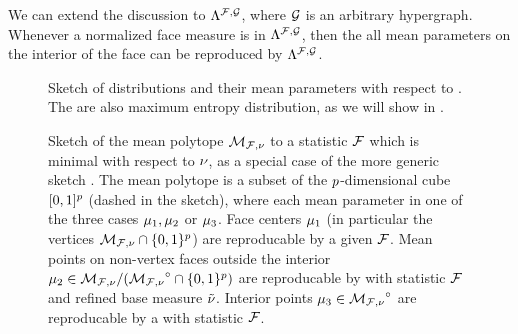 We can extend the discussion to $\Lambda^{\mathcal{F},\mathcal{G}}$, where $\mathcal{G}$ is an arbitrary hypergraph.
Whenever a normalized face measure is in $\Lambda^{\mathcal{F},\mathcal{G}}$, then the all mean parameters on the interior of the face can be reproduced by $\Lambda^{\mathcal{F},\mathcal{G}}$.

%




\begin{figure}[t]
    \begin{center}
        
    \end{center}
    \caption{Sketch of distributions and their mean parameters with respect to .
    The \HybridLogicNetworks{} are also maximum entropy distribution, as we will show in .}
    \label{fig:reproducableSketch}
\end{figure}

\begin{figure}[t]
    \begin{center}
        
    \end{center}
    \caption{Sketch of the mean polytope ${\mathcal{M}_{\mathcal{F},\nu}}$ to a statistic $\mathcal{F}$ which is minimal with respect to $\nu$, as a special case of the more generic sketch .
    The mean polytope is a subset of the $p$-dimensional cube $[0,1]^{p}$ (dashed in the sketch), where each mean parameter in one of the three cases $\mu_{1},\mu_{2}$ or $\mu_{3}$.
    \textcolor{\concolor}{Face centers} $\mu_{1}$ (in particular the vertices $\mathcal{M}_{\mathcal{F},\nu}\cap\{0,1\}^{p}$) are reproducable by a \HardLogicNetwork{} given $\mathcal{F}$.
    Mean points on non-vertex faces outside the interior $\mu_{2}\in\mathcal{M}_{\mathcal{F},\nu}/({\mathcal{M}_{\mathcal{F},\nu}}^{\circ}\cap\{0,1\}^{p})$ are reproducable by \HybridLogicNetworks{} with statistic $\mathcal{F}$ and refined base measure $\tilde{\nu}$.
    \textcolor{\probcolor}{Interior points} $\mu_{3}\in{\mathcal{M}_{\mathcal{F},\nu}}^{\circ}$ are reproducable by a \MarkovLogicNetwork{} with statistic $\mathcal{F}$.
    }\label{fig:meansetSketch}
\end{figure}

